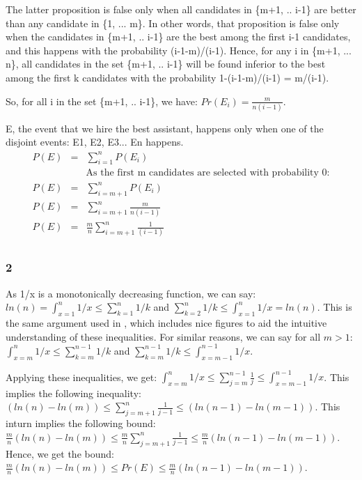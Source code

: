 \documentclass[10pt]{article}
\begin{document}
The latter proposition is false only when all candidates in \{m+1, .. i-1\} are better than any candidate in \{1, ... m\}. In other words, that proposition is false only when the candidates in \{m+1, .. i-1\} are the best among the first i-1 candidates, and this happens with the probability (i-1-m)/(i-1). Hence, for any i in \{m+1, ... n\}, all candidates in the set \{m+1, .. i-1\} will be found inferior to the best among the first k candidates with the probability 1-(i-1-m)/(i-1) = m/(i-1).

So, for all i in the set \{m+1, .. i-1\}, we have: $Pr(E_{i}) = \frac{m}{n(i-1)}$.

E, the event that we hire the best assistant, happens only when one of the disjoint events: E1, E2, E3... En happens. 
\begin{eqnarray}
P(E) &=& \sum_{i=1}^{n} P(E_{i})\\
&& \text{As the first m candidates are selected with probability 0:}\\
P(E) &=& \sum_{i=m+1}^{n} P(E_{i})\\
P(E) &=& \sum_{i=m+1}^{n} \frac{m}{n(i-1)}\\
P(E) &=& \frac{m}{n}\sum_{i=m+1}^{n} \frac{1}{(i-1)}\\
\end{eqnarray}

\subsubsection*{2} 

As 1/x is a monotonically decreasing function, we can say: $ln(n)=\int_{x=1}^{n}1/x \leq \sum_{k=1}^{n}1/k$ and $\sum_{k=2}^{n}1/k \leq \int_{x=1}^{n}1/x =ln(n)$. This is the same argument used in \cite{mitzenmacherUpfal}, which includes nice figures to aid the intuitive understanding of these inequalities. For similar reasons, we can say for all $m>1$: $\int_{x=m}^{n}1/x \leq \sum_{k=m}^{n-1}1/k$ and $\sum_{k=m}^{n-1}1/k \leq \int_{x=m-1}^{n-1}1/x$.

Applying these inequalities, we get: $\int_{x=m}^{n}1/x \leq \sum_{j=m}^{n-1}\frac{1}{j} \leq \int_{x=m-1}^{n-1}1/x$. This implies the following inequality: $(ln(n) - ln(m)) \leq \sum_{j=m+1}^{n}\frac{1}{j-1} \leq (ln (n-1) - ln (m-1))$. This inturn implies the following bound: $\frac{m}{n}(ln(n) - ln(m)) \leq \frac{m}{n}\sum_{j=m+1}^{n}\frac{1}{j-1} \leq \frac{m}{n}(ln (n-1) - ln (m-1))$. Hence, we get the bound: $\frac{m}{n}(ln(n) - ln(m)) \leq Pr(E) \leq \frac{m}{n}(ln (n-1) - ln (m-1))$.
\end{document}
